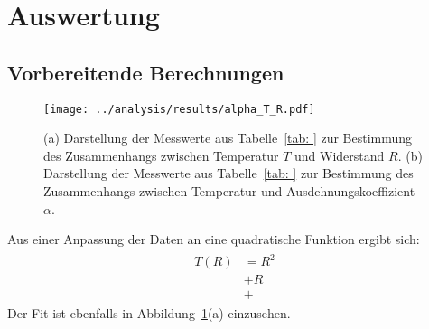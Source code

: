 \section{Auswertung}



\subsection{Vorbereitende Berechnungen}
\begin{figure}
\centering
\texttt{[image: ../analysis/results/alpha\_T\_R.pdf]}
\caption{(a) Darstellung der Messwerte aus Tabelle~\ref{tab: } zur Bestimmung des Zusammenhangs zwischen Temperatur $T$ und Widerstand $R$.
        (b) Darstellung der Messwerte aus Tabelle~\ref{tab: } zur Bestimmung des Zusammenhangs zwischen Temperatur und Ausdehnungskoeffizient $\alpha$.}
\label{fig: alpha_T_R}
\end{figure}

Aus einer Anpassung der Daten an eine quadratische Funktion ergibt sich: 
\begin{align}
\begin{aligned}
    T(R) &=  R^2 \\
            &+  R \\
            &+  
\end{aligned}             
\end{align}
Der Fit ist ebenfalls in Abbildung~\ref{fig: alpha_T_R}(a) einzusehen.